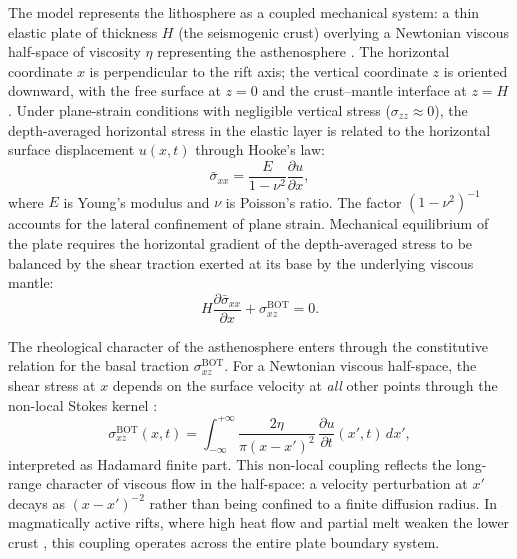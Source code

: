 \documentclass[extra]{gji}
\begin{document}
The model represents the lithosphere as a coupled mechanical system: a thin
elastic plate of thickness $H$ (the seismogenic crust) overlying a
Newtonian viscous half-space of viscosity $\eta$ representing the asthenosphere
\citep[e.g.,][]{hetland2005postseismic,hetland2006thesis}.
The horizontal coordinate $x$ is perpendicular to the rift axis; the vertical
coordinate $z$ is oriented downward, with the free surface at $z = 0$ and the
crust--mantle interface at $z = H$. Under plane-strain conditions with
negligible vertical stress ($\sigma_{zz}\approx 0$), the depth-averaged
horizontal stress in the elastic layer is related to the horizontal surface
displacement $u(x,t)$ through Hooke's law:
\begin{equation}
\bar{\sigma}_{xx} = \frac{E}{1-\nu^2}\frac{\partial u}{\partial x},
\label{eq:hookean}
\end{equation}
where $E$ is Young's modulus and $\nu$ is Poisson's ratio. The factor
$(1-\nu^2)^{-1}$ accounts for the lateral confinement of plane strain.
Mechanical equilibrium of the plate requires the horizontal gradient of the
depth-averaged stress to be balanced by the shear traction exerted at its base
by the underlying viscous mantle:
\begin{equation}
H\frac{\partial\bar{\sigma}_{xx}}{\partial x} + \sigma_{xz}^{\text{BOT}} = 0.
\label{eq:equil}
\end{equation}

The rheological character of the asthenosphere enters through the constitutive
relation for the basal traction $\sigma_{xz}^{\text{BOT}}$. For a Newtonian
viscous half-space, the shear stress at $x$ depends on the surface velocity
at \emph{all} other points through the non-local Stokes kernel
\citep{savage1978asthenosphere}:
\begin{equation}
\sigma_{xz}^{\text{BOT}}(x,t) =
  \int_{-\infty}^{+\infty}\frac{2\eta}{\pi(x-x')^2}\,
  \frac{\partial u}{\partial t}(x',t)\,dx',
\label{eq:stokes}
\end{equation}
interpreted as Hadamard finite part. This non-local coupling reflects the
long-range character of viscous flow in the half-space: a velocity perturbation
at $x'$ decays as $(x-x')^{-2}$ rather than being confined to a finite
diffusion radius. In magmatically active rifts, where high heat flow and partial
melt weaken the lower crust \citep{holtzman2016questions,plasman2017lithospheric}, this
coupling operates across the entire plate boundary system.
\end{document}
